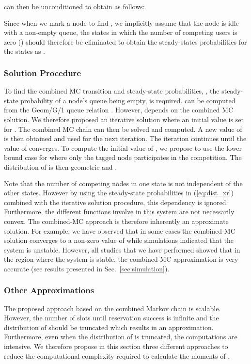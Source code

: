 \documentclass[12pt,journal,oneside,onecolumn]{IEEEtran}
\begin{document}
\small

\normalsize
 can then be unconditioned to obtain  as follows:

Since when we mark a node to find , 
we implicitly assume that the node is idle with a non-empty queue,
the states in which the number of competing users is zero () 
should therefore be eliminated to obtain the steady-states probabilities for the states  as .


\subsubsection{Solution Procedure}
\label{sec:sol_proc}

To find the combined MC transition and steady-state probabilities, , the steady-state probability of 
a node's queue being empty, is required.  can be computed from the Geom/G/1 queue
relation . However,  depends on the combined MC solution.  
We therefore proposed an iterative solution where an initial value is set for . 
The combined MC chain can then be solved and  computed. A new value of  is then obtained and
used for the next iteration.
The iteration continues until the value of  converges. 
To compute the initial value of , we propose to use the lower bound case for   
where only the tagged node participates in the competition. The distribution of  is then geometric and .

Note that the number of competing nodes in one state is not independent of the other states. 
However by using the steady-state probabilities in (\ref{eq:dist_xr}) combined with the iterative solution procedure, this dependency is ignored. 
Furthermore, the different functions involve in this system are not necessarily convex. 
The combined-MC approach is therefore inherently an approximate solution.
For example, we have observed that in some cases the combined-MC solution converges to a non-zero value of  while
simulations indicated that the system is unstable. However, all studies that we have performed showed that in the region where
the system is stable, the combined-MC approximation is very accurate (see results presented in Sec.~\ref{sec:simulation}).

\subsubsection{Other Approximations}
\label{sec:xr_approx}

The proposed approach based on the combined Markov chain is scalable. 
However, the number of slots until 
reservation success is infinite and the distribution of  should be truncated
which results in an approximation. Furthermore, even when the distribution of  is truncated,
the computations are intensive. We therefore propose in this section three different approaches
to reduce the computational complexity required to calculate the moments of .
\end{document}
